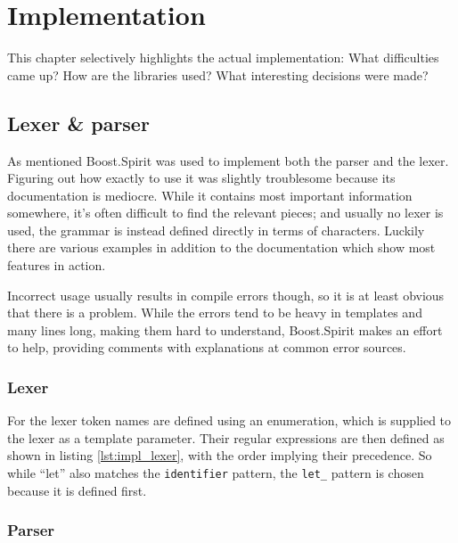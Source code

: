 \chapter{Implementation}

	This chapter selectively highlights the actual implementation: What difficulties came up? How are the libraries used? What interesting decisions were made?
	
	\section{Lexer \& parser}
		
		As mentioned Boost.Spirit was used to implement both the parser and the lexer. Figuring out how exactly to use it was slightly troublesome because its documentation is mediocre. While it contains most important information somewhere, it's often difficult to find the relevant pieces; and usually no lexer is used, the grammar is instead defined directly in terms of characters. Luckily there are various examples in addition to the documentation which show most features in action.
		
		Incorrect usage usually results in compile errors though, so it is at least obvious that there is a problem. While the errors tend to be heavy in templates and many lines long, making them hard to understand, Boost.Spirit makes an effort to help, providing comments with explanations at common error sources.
		
		
		\subsection{Lexer}
				
		For the lexer token names are defined using an enumeration, which is supplied to the lexer as a template parameter. Their regular expressions are then defined as shown in listing \ref{lst:impl_lexer}, with the order implying their precedence. So while ``let'' also matches the \lstinline$identifier$ pattern, the \lstinline$let_$ pattern is chosen because it is defined first.
		
		
		
		\subsection{Parser}
		
